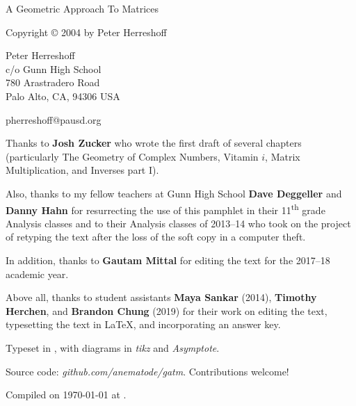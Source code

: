 \documentclass[../gatm.tex]{subfiles}
\begin{document}
\newcommand\dnew{\vspace{1cm}}

\begin{center}
	\vspace*{\fill}

	\doublespacing
	A Geometric Approach To Matrices

	Copyright \copyright{} 2004 by Peter Herreshoff  %

	\vspace{1cm}

	Peter Herreshoff\\
	c/o Gunn High School\\
	780 Arastradero Road\\
	Palo Alto, CA, 94306 USA

	\vspace{.5cm}

	pherreshoff@pausd.org

	\vspace{1cm}
\end{center}

\noindent Thanks to \textbf{Josh Zucker} who wrote the first draft of several chapters (particularly The Geometry of Complex Numbers, Vitamin $i$, Matrix Multiplication, and Inverses part I).

Also, thanks to my fellow teachers at Gunn High School \textbf{Dave Deggeller} and \textbf{Danny Hahn} for resurrecting the use of this pamphlet in their 11\textsuperscript{th} grade Analysis classes and to their Analysis classes of 2013--14 who took on the project of retyping the text after the loss of the soft copy in a computer theft.

In addition, thanks to \textbf{Gautam Mittal} for editing the text for the 2017--18 academic year.

Above all, thanks to student assistants \textbf{Maya Sankar} (2014), \textbf{Timothy Herchen}, and \textbf{Brandon Chung} (2019) for their work on editing the text, typesetting the text in \LaTeX{}, and incorporating an answer key.

\vspace{0.5cm}

Typeset in \LaTeXe, with diagrams in \textit{tikz} and \textit{Asymptote}.

Source code: \textit{github.com/anematode/gatm}. Contributions welcome!

Compiled on {\ddmmyyyydate\today} at \currenttime.

\vspace*{\fill}
\end{document}
